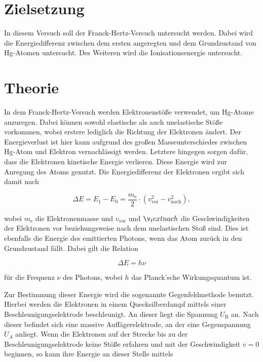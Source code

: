 \section{Zielsetzung}

In diesem Versuch soll der Franck-Hertz-Versuch untersucht werden. Dabei wird die Energiedifferenz zwischen dem ersten angeregten und dem Grundzustand von Hg-Atomen untersucht.
Des Weiteren wird die Ionisationsenergie untersucht.

\section{Theorie}
\label{sec:Theorie}

In dem Franck-Hertz-Versuch werden Elektronenstöße verwendet, um Hg-Atome anzuregen.
Dabei können sowohl elastische als auch unelastische Stöße vorkommen, wobei erstere lediglich die Richtung der Elektronen ändert. Der Energieverlust ist hier kann aufgrund des großen Masseunterschiedes zwischen Hg-Atom und Elektron vernachlässigt werden.
Letztere hingegen sorgen dafür, dass die Elektronen kinetische Energie verlieren. Diese Energie wird zur Anregung des Atoms genutzt.
Die Energiedifferenz der Elektronen ergibt sich damit nach

\begin{equation}
    \label{eqn:e-diff}
    \Delta E = E_1 - E_0 = \frac{m_\text{e}}{2} \cdot (v_\text{vor}^2 - v_\text{nach}^2),
\end{equation}

wobei $m_\text{e}$ die Elektronenmasse und $v_\text{vor}$ und $\v_text{nach}$ die Geschwindigkeiten der Elektronen vor beziehungsweise nach dem unelastischen Stoß sind.
Dies ist ebenfalls die Energie des emittierten Photons, wenn das Atom zurück in den Grundzustand fällt. Dabei gilt die Relation

\begin{equation}
    \label{eqn:photon-energie}
    \Delta E = h \nu
\end{equation}

für die Frequenz $\nu$ des Photons, wobei $h$ das Planck'sche Wirkungsquantum ist.

Zur Bestimmung dieser Energie wird die sogenannte Gegenfeldmethode benutzt.
Hierbei werden die Elektronen in einem Quecksilberdampf mittels einer Beschleunigungselektrode beschleunigt. An dieser liegt die Spannung $U_\text{B}$ an.
Nach dieser befindet sich eine massive Auffägerelektrode, an der eine Gegenspannung $U_A$ anliegt.
Wenn die Elektronen auf der Strecke bis zu der Beschleunigungselektrode keine Stöße erfahren und mit der Geschwindigkeit $v = 0$ beginnen, so kann ihre Energie an dieser Stelle mittels


